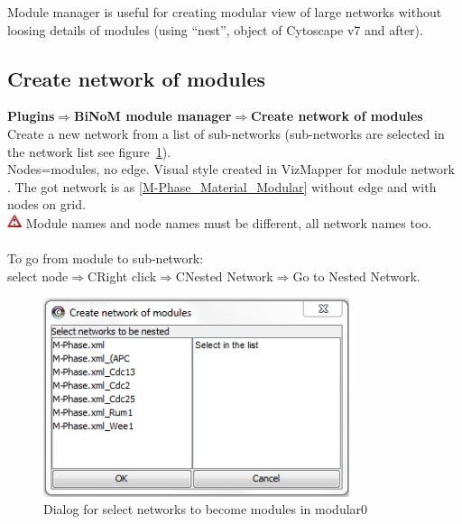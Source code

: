 Module manager is useful for creating modular view of large networks without loosing details of modules (using “nest”, object of Cytoscape v7 and after).

\subsection{Create network of modules}
\textbf{Plugins$\Rightarrow$BiNoM module manager$\Rightarrow$Create network of modules}\\
Create a new network from a list of sub-networks (sub-networks are selected in the network list see figure~\ref{Create_network_of_modules}).\\
Nodes=modules, no edge. Visual style created in VizMapper for module network . The got network is as \ref{M-Phase_Material_Modular} without edge and with nodes on grid.\\
\includegraphics[width=12pt,height=12pt]{graphics/warning} Module names and node names must be different, all network names too.\\\\
To go from module to sub-network:\\
select node$\Rightarrow$CRight click$\Rightarrow$CNested Network$\Rightarrow$Go to Nested Network.
\begin{figure}
\centering
\includegraphics[width=0.8\textwidth]{graphics/Create_network_of_modules}
\caption{Dialog for select networks to become modules in modular0}
\label{Create_network_of_modules}
\end{figure}

